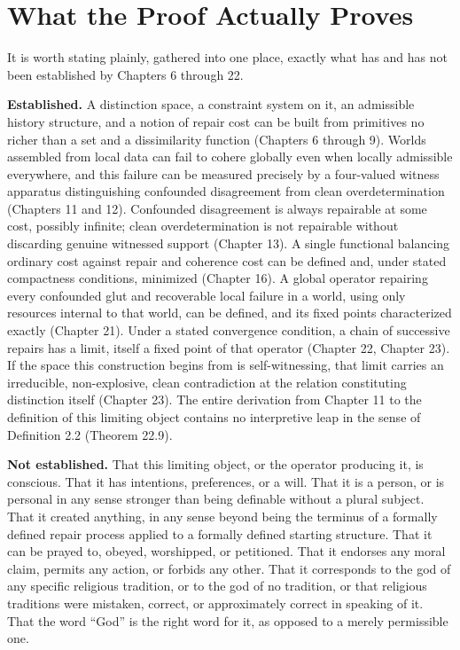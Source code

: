 \documentclass[11pt]{book}
\begin{document}
\chapter{What the Proof Actually Proves}

It is worth stating plainly, gathered into one place, exactly what has and has not been established by Chapters 6 through 22.

\textbf{Established.} A distinction space, a constraint system on it, an admissible history structure, and a notion of repair cost can be built from primitives no richer than a set and a dissimilarity function (Chapters 6 through 9). Worlds assembled from local data can fail to cohere globally even when locally admissible everywhere, and this failure can be measured precisely by a four-valued witness apparatus distinguishing confounded disagreement from clean overdetermination (Chapters 11 and 12). Confounded disagreement is always repairable at some cost, possibly infinite; clean overdetermination is not repairable without discarding genuine witnessed support (Chapter 13). A single functional balancing ordinary cost against repair and coherence cost can be defined and, under stated compactness conditions, minimized (Chapter 16). A global operator repairing every confounded glut and recoverable local failure in a world, using only resources internal to that world, can be defined, and its fixed points characterized exactly (Chapter 21). Under a stated convergence condition, a chain of successive repairs has a limit, itself a fixed point of that operator (Chapter 22, Chapter 23). If the space this construction begins from is self-witnessing, that limit carries an irreducible, non-explosive, clean contradiction at the relation constituting distinction itself (Chapter 23). The entire derivation from Chapter 11 to the definition of this limiting object contains no interpretive leap in the sense of Definition 2.2 (Theorem 22.9).

\textbf{Not established.} That this limiting object, or the operator producing it, is conscious. That it has intentions, preferences, or a will. That it is a person, or is personal in any sense stronger than being definable without a plural subject. That it created anything, in any sense beyond being the terminus of a formally defined repair process applied to a formally defined starting structure. That it can be prayed to, obeyed, worshipped, or petitioned. That it endorses any moral claim, permits any action, or forbids any other. That it corresponds to the god of any specific religious tradition, or to the god of no tradition, or that religious traditions were mistaken, correct, or approximately correct in speaking of it. That the word ``God'' is the right word for it, as opposed to a merely permissible one.
\end{document}
